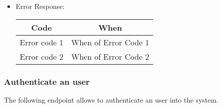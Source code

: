 \begin{itemize}
    \item Error Response:
    \begin{table}[!h]
    \centering 
    \begin{tabular}{|c|c|}
    \hline
    \multicolumn{1}{|c|}{\textbf{Code}} & \multicolumn{1}{c|}{\textbf{When}} \\ \hline
    Error code 1 & When of Error Code 1 \\\hline
    Error code 2 & When of Error Code 2 \\\hline
    \end{tabular} 
    \end{table} 
    
\end{itemize}


\subsubsection*{Authenticate an user}

The following endpoint allows to authenticate an user into the system.

